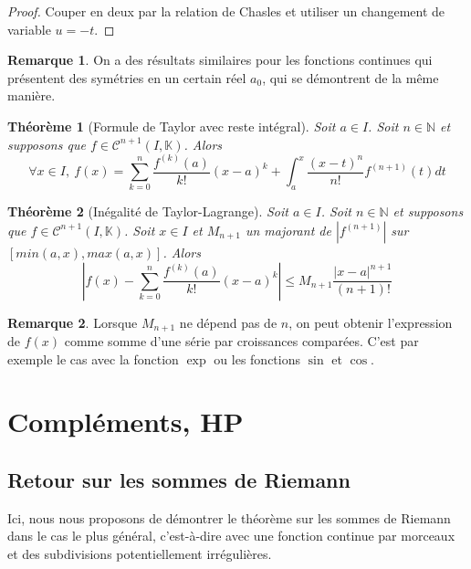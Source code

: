 \documentclass[french]{book}
\newcommand{\N}{\mathbb{N}}
\newcommand{\K}{\mathbb{K}}
\theoremstyle{plain}
\newtheorem{thm}{Théorème}[chapter]
\theoremstyle{definition}
\newtheorem{rmq}{Remarque}[chapter]
\theoremstyle{remark}
\begin{document}
\begin{proof}
	Couper en deux par la relation de Chasles et utiliser un changement de variable $u=-t$.
\end{proof}
\begin{rmq} On a des résultats similaires pour les fonctions continues qui présentent des symétries en un certain réel $a_0$, qui se démontrent de la même manière. \end{rmq}
\begin{thm}[Formule de Taylor avec reste intégral]
	Soit $a\in I$. Soit $n\in\N$ et supposons que $f\in\mathcal{C}^{n+1}(I,\K)$. Alors $$\forall x \in I, \ f(x)=\sum_{k=0}^{n}\frac{f^{(k)}(a)}{k!}(x-a)^k + \int_{a}^{x}\frac{(x-t)^n}{n!}f^{(n+1)}(t)dt$$
\end{thm}
\begin{thm}[Inégalité de Taylor-Lagrange]
	Soit $a\in I$. Soit $n\in\N$ et supposons que $f\in\mathcal{C}^{n+1}(I,\K)$. Soit $x \in I$ et $M_{n+1}$ un majorant de $|f^{(n+1)}|$ sur $[min(a,x),max(a,x)]$. Alors 
	$$\left\lvert f(x)-\sum_{k=0}^{n}\frac{f^{(k)}(a)}{k!}(x-a)^k\right\rvert \leqslant M_{n+1}\frac{|x-a|^{n+1}}{(n+1)!}$$
\end{thm}
\begin{rmq} Lorsque $M_{n+1}$ ne dépend pas de $n$, on peut obtenir l'expression de $f(x)$ comme somme d'une série par croissances comparées. C'est par exemple le cas avec la fonction $\exp$ ou les fonctions $\sin$ et $\cos$. \end{rmq}
\section{Compléments, HP}
\subsection{Retour sur les sommes de Riemann}

Ici, nous nous proposons de démontrer le théorème sur les sommes de Riemann dans le cas le plus général, c'est-à-dire avec une fonction continue par morceaux et des subdivisions potentiellement irrégulières.
\end{document}
